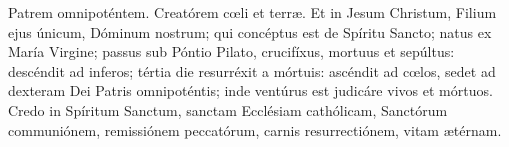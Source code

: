 Patrem omnipoténtem. Creatórem c{\oe}li et terr{\ae}. Et in Jesum Christum, Filium ejus únicum, Dóminum nostrum; 
qui concéptus est de Spíritu Sancto; natus ex María Virgine; passus sub Póntio Pilato, crucifíxus, mortuus et sepúltus:
descéndit ad inferos; tértia die resurréxit a mórtuis: ascéndit ad c{\oe}los, sedet ad dexteram Dei Patris omnipoténtis;
inde ventúrus est judicáre vivos et mórtuos. Credo in Spíritum Sanctum, sanctam Ecclésiam cathólicam, Sanctórum communiónem,
remissiónem peccatórum, carnis resurrectiónem, vitam {\ae}térnam. 